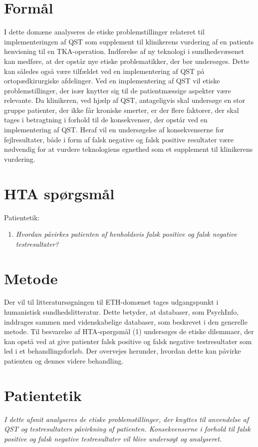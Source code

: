 \section{Formål}
I dette domæne analyseres de etiske problemstillinger relateret til implementeringen af QST som supplement til klinikerens vurdering af en patients henvisning til en TKA-operation. Indførelse af ny teknologi i sundhedsvæsenet kan medføre, at der opstår nye etiske problematikker, der bør undersøges. Dette kan således også være tilfældet ved en implementering af QST på ortopædkirurgiske afdelinger. Ved en implementering af QST vil etiske problemstillinger, der især knytter sig til de patientmæssige aspekter være relevante. Da klinikeren, ved hjælp af QST, antageligvis skal undersøge en stor gruppe patienter, der ikke får kroniske smerter, er der flere faktorer, der skal tages i betragtning i forhold til de konsekvenser, der opstår ved en implementering af QST. Heraf vil en undersøgelse af konsekvenserne for fejlresultater, både i form af falsk negative og falsk positive resultater være nødvendig for at vurdere teknologiens egnethed som et supplement til klinikerens vurdering.



\section{HTA spørgsmål}
Patientetik:
\begin{enumerate}
\item \textit{Hvordan påvirkes patienten af henholdsvis falsk positive og falsk negative testresultater?} %
\end{enumerate}


\section{Metode}
Der vil til litteratursøgningen til ETH-domænet tages udgangspunkt i humanistisk sundhedslitteratur. Dette betyder, at databaser, som PsychInfo, inddrages sammen med videnskabelige databaser, som beskrevet i den generelle metode. 
Til besvarelse af HTA-spørgsmål (1) undersøges de etiske dilemmaer, der kan opstå ved at give patienter falsk positive og falsk negative testresultater som led i et behandlingsforløb. Der overvejes herunder, hvordan dette kan påvirke patienten og dennes videre behandling.


\section{Patientetik}
\textit{I dette afsnit analyseres de etiske problemstillinger, der knyttes til anvendelse af QST og testresultaters påvirkning af patienten. Konsekvenserne i forhold til falsk positive og falsk negative testresultater vil blive undersøgt og analyseret.}


